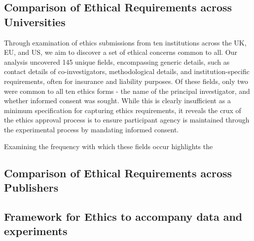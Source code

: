 \subsection{Comparison of Ethical Requirements across Universities}

Through examination of ethics submissions from ten institutions across the UK, EU, and US,
we aim to discover a set of ethical concerns common to all. 
Our analysis uncovered 145 unique fields, 
encompassing generic details, such as contact details of co-investigators, methodological
details, and institution-specific requirements, often for insurance and liability purposes.
Of these fields, only two were common to all ten ethics forms - the name of the principal
investigator, and whether informed consent was sought. While this is clearly insufficient
as a minimum specification for capturing ethics requirements, it reveals the crux of the 
ethics approval process is to ensure participant agency is maintained through the experimental process by mandating informed consent.

Examining the frequency with which these fields occur highlights the 






\subsection{Comparison of Ethical Requirements across Publishers}

\subsection{Framework for Ethics to accompany data and experiments}

